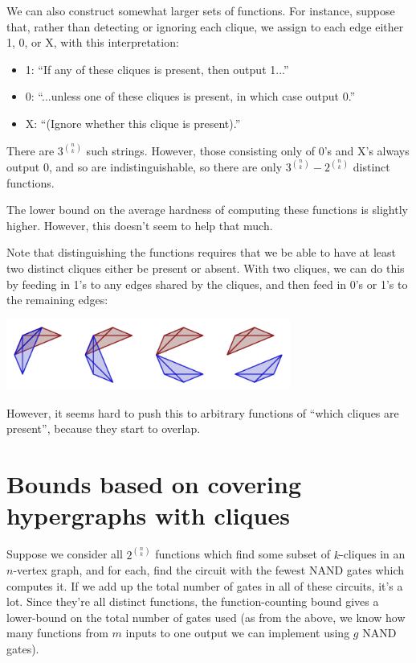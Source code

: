 \documentclass[12pt]{article}
\theoremstyle{definition}
\begin{document}
We can also construct somewhat larger sets of functions. For instance,
suppose that, rather than detecting or ignoring each clique, we assign
to each edge either 1, 0, or X, with this interpretation:

\begin{itemize}

\item 1: ``If any of these cliques is present, then output 1...''

\item 0: ``...unless one of these cliques is present, in which case output 0.''

\item X: ``(Ignore whether this clique is present).''

\end{itemize}

There are $3^{n \choose k}$ such strings. However, those consisting only of
0's and X's always output 0, and so are indistinguishable, so there are
only $3^{n \choose k} - 2^{n \choose k}$ distinct functions.

The lower bound on the average hardness of computing these functions is
slightly higher. However, this doesn't seem to help that much.

Note that distinguishing the functions requires that we be able to have at
least two distinct cliques either be present or absent. With two cliques,
we can do this by feeding in 1's to any edges shared by the cliques, and
then feed in 0's or 1's to the remaining edges:

\includegraphics[width=0.7\textwidth]{R/overlapping.pdf}

However, it seems hard to push this to arbitrary functions of ``which cliques are
present'', because they start to overlap.

\section{Bounds based on covering hypergraphs with cliques}
\label{sec:linearInequality}

Suppose we consider all $2^{n \choose k}$ functions which find some subset
of $k$-cliques in an $n$-vertex graph, and for each, find the circuit with
the fewest NAND gates which computes it. If we add up the total number of
gates in all of these circuits,
it's a lot. Since they're all distinct functions, the
function-counting bound gives a lower-bound on
the total number of gates used (as from the
above, we know how many functions from $m$ inputs to one output
we can implement using $g$ NAND gates).
\end{document}
